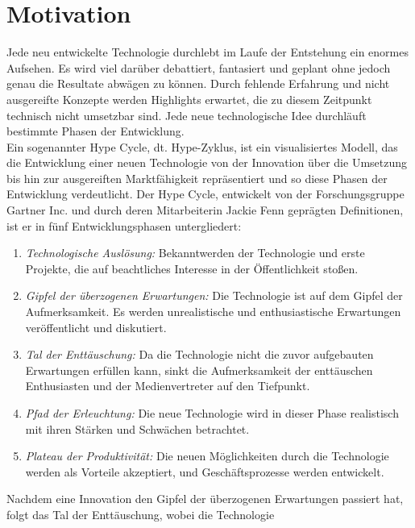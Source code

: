 \section{Motivation}
\label{chap:Motivation}
Jede neu entwickelte Technologie durchlebt im Laufe der Entstehung ein enormes Aufsehen. Es wird viel darüber debattiert, fantasiert 
und geplant ohne jedoch genau die Resultate abwägen zu können. Durch fehlende Erfahrung und nicht ausgereifte Konzepte werden Highlights 
erwartet, die zu diesem Zeitpunkt technisch nicht umsetzbar sind. Jede neue technologische Idee durchläuft bestimmte Phasen der Entwicklung.
\cite{studiob12.2020j} 
\\ 
\linebreak
Ein sogenannter Hype Cycle, dt. Hype-Zyklus, ist ein visualisiertes Modell, das die Entwicklung einer neuen Technologie von der 
Innovation über die Umsetzung bis hin zur ausgereiften Marktfähigkeit repräsentiert und so diese Phasen der Entwicklung verdeutlicht.
Der Hype Cycle, entwickelt von der Forschungsgruppe Gartner Inc. und durch deren Mitarbeiterin Jackie Fenn geprägten Definitionen, ist er 
in fünf Entwicklungsphasen untergliedert:
\begin{enumerate}
    \item \textit{Technologische Auslösung:} Bekanntwerden der Technologie und erste Projekte, die auf beachtliches Interesse in der 
    Öffentlichkeit stoßen. 
    \item \textit{Gipfel der überzogenen Erwartungen:} Die Technologie ist auf dem Gipfel der Aufmerksamkeit. Es werden unrealistische 
    und enthusiastische Erwartungen veröffentlicht und diskutiert.
    \item \textit{Tal der Enttäuschung:} Da die Technologie nicht die zuvor aufgebauten Erwartungen erfüllen kann, sinkt die Aufmerksamkeit 
    der enttäuschen Enthusiasten und der Medienvertreter auf den Tiefpunkt.
    \item \textit{Pfad der Erleuchtung:} Die neue Technologie wird in dieser Phase realistisch mit ihren Stärken und Schwächen betrachtet.
    \item \textit{Plateau der Produktivität:} Die neuen Möglichkeiten durch die Technologie werden als Vorteile akzeptiert, und 
    Geschäftsprozesse werden entwickelt. \cite{gartnerhc.2016s}
\end{enumerate} 
Nachdem eine Innovation den Gipfel der überzogenen Erwartungen passiert hat, folgt das Tal der Enttäuschung, wobei die Technologie 
